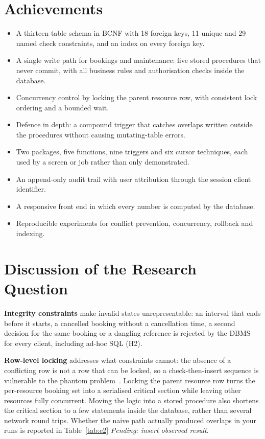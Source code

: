 \documentclass[12pt,a4paper,oneside]{report}
\newcommand{\pending}[1]{\textcolor{black!55}{\textit{Pending: #1}}}
\renewcommand{\_}{\origus\allowbreak}
\begin{document}
\section{Achievements}
\begin{itemize}
  \item A thirteen-table schema in BCNF with 18 foreign keys, 11 unique and 29 named check constraints, and an index on every foreign key.
  \item A single write path for bookings and maintenance: five stored procedures that never commit, with all business rules and authorisation checks inside the database.
  \item Concurrency control by locking the parent resource row, with consistent lock ordering and a bounded wait.
  \item Defence in depth: a compound trigger that catches overlaps written outside the procedures without causing mutating-table errors.
  \item Two packages, five functions, nine triggers and six cursor techniques, each used by a screen or job rather than only demonstrated.
  \item An append-only audit trail with user attribution through the session client identifier.
  \item A responsive front end in which every number is computed by the database.
  \item Reproducible experiments for conflict prevention, concurrency, rollback and indexing.
\end{itemize}

\section{Discussion of the Research Question}
\textbf{Integrity constraints} make invalid states unrepresentable: an interval that ends before it starts, a cancelled booking without a cancellation time, a second decision for the same booking or a dangling reference is rejected by the DBMS for every client, including ad-hoc SQL (H2).

\textbf{Row-level locking} addresses what constraints cannot: the absence of a conflicting row is not a row that can be locked, so a check-then-insert sequence is vulnerable to the phantom problem~\cite{eswaran,berenson}. Locking the parent resource row turns the per-resource booking set into a serialised critical section while leaving other resources fully concurrent. Moving the logic into a stored procedure also shortens the critical section to a few statements inside the database, rather than several network round trips. Whether the naive path actually produced overlaps in your runs is reported in Table~\ref{tab:e2} \pending{insert observed result}.
\end{document}
